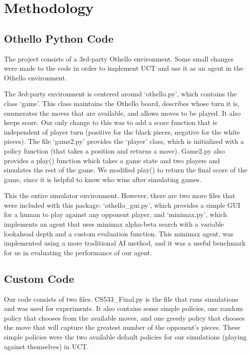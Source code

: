\documentclass[12pt,letterpaper]{article}
\begin{document}
\pagebreak
\section{Methodology}
\label{meth}

\subsection{Othello Python Code}

The project consists of a 3rd-party Othello environment. Some small changes were made to the code in order to implement UCT and use it as an agent in the Othello environment.

The 3rd-party environment is centered around `othello.py', which contains the class `game'. This class maintains the Othello board, describes whose turn it is, enumerates the moves that are available, and allows moves to be played. It also keeps score. Our only change to this was to add a score function that is independent of player turn (positive for the black pieces, negative for the white pieces). The file `game2.py' provides the `player' class, which is initialized with a policy function (that takes a position and returns a move). Game2.py also provides a play() function which takes a game state and two players and simulates the rest of the game. We modified play() to return the final score of the game, since it is helpful to know who wins after simulating games. 

This the entire simulator environment. However, there are two more files that were included with this package: `othello\_gui.py', which provides a simple GUI for a human to play against any opponent player, and `minimax.py', which implements an agent that uses minimax alpha-beta search with a variable lookahead depth and a custom evaluation function. This minimax agent, was implemented using a more traditional AI method, and it was a useful benchmark for us in evaluating the performance of our agent.

\subsection{Custom Code}

Our code consists of two files. CS533\_Final.py is the file that runs simulations and was used for experiments. It also contains some simple policies, one random policy that chooses from the available moves, and one greedy policy that chooses the move that will capture the greatest number of the opponent's pieces. These simple policies were the two available default policies for our simulations (playing against themselves) in UCT.
\end{document}
